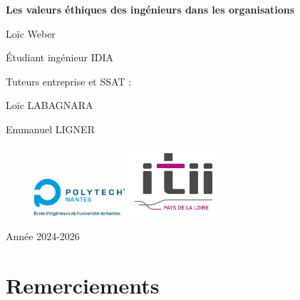 \documentclass[12pt,a4paper]{report}
\begin{document}

\begin{titlepage}
    \centering
    \vspace*{2cm}
    
    {\Huge\bfseries Les valeurs éthiques des ingénieurs dans les organisations\par}
    \vspace{2cm}
    
    {\Large Loïc Weber\par}
    {\large Étudiant ingénieur IDIA\par}
    
    \vfill
    
    {\large Tuteurs entreprise et SSAT :\par}
    \vspace{0.5cm}
    {\large Loïc LABAGNARA\par}
    {\large Emmanuel LIGNER\par}
    
    \vfill
    
    \begin{figure}[h]
        \centering
        \includegraphics[width=0.3\textwidth]{./assets/polytech-nantes.jpg}
        \hspace{2cm}
        \includegraphics[width=0.3\textwidth]{./assets/itii.png}
    \end{figure}
    
    \vspace{1cm}
    {\large Année 2024-2026\par}
\end{titlepage}

\chapter*{Remerciements}
\end{document}
